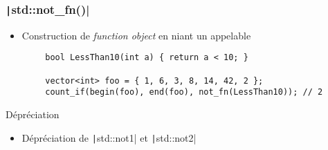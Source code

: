\documentclass[C++.tex]{subfiles}
\begin{document}
\begin{frame}[fragile]
	\frametitle{\texttt|std::not_fn()|}
	\begin{itemize}
		\item Construction de \textit{function object} en niant un appelable
	\end{itemize}

	\begin{verbatim}
		bool LessThan10(int a) { return a < 10; }

		vector<int> foo = { 1, 6, 3, 8, 14, 42, 2 };
		count_if(begin(foo), end(foo), not_fn(LessThan10)); // 2
	\end{verbatim}

	\begin{block}{Dépréciation}
		\begin{itemize}
			\item Dépréciation de \texttt|std::not1| et \texttt|std::not2|
		\end{itemize}
	\end{block}


\end{frame}
\end{document}
